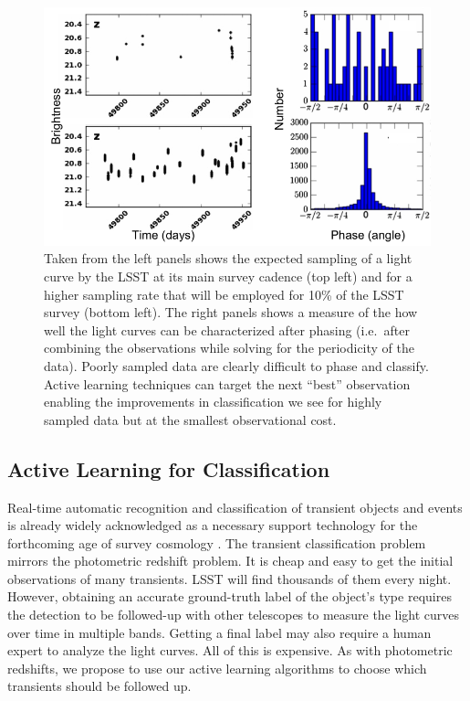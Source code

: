 \documentclass[prd,nofootbib,floatfix,11pt,tightenlines]{revtex4}
\begin{document}
\begin{figure}[t]
\centerline{
\includegraphics[scale=1.0]{rrlyrae.png}
}
\caption{
Taken from \cite{rrlyrae} the left panels shows the expected
sampling of
a light curve by the LSST at its main survey cadence (top left) and
for a higher sampling rate that will be employed for 10\% of the LSST
survey (bottom left). The right panels shows a measure of the  how well
the light curves can be characterized after phasing (i.e.\ after combining the observations while solving
for the periodicity of the data). Poorly sampled data are clearly
difficult to phase and classify. Active learning techniques can target
the next ``best'' observation enabling the improvements in
classification we see for highly sampled data but at the smallest observational cost.}

\label{fig:RRLyrae}
\end{figure}

\subsection{Active Learning for Classification}
\label{sec:transients}

Real-time automatic recognition and classification of transient objects and
events is already widely acknowledged as a necessary support technology for
the forthcoming age of survey cosmology
\cite{djorgovski2011,richards2011,richards2012,graham2012,mahabal2008a,mahabal2011a}.
The transient classification problem mirrors the photometric redshift
problem.  It is cheap and easy to get the initial observations of many
transients.  LSST will find thousands of them every night.  However,
obtaining an accurate ground-truth label of the object's type requires the
detection to be followed-up with other telescopes to measure the light
curves over time in multiple bands.  Getting a final label may also require
a human expert to analyze the light curves.  All of this is expensive.  As
with photometric redshifts, we propose to use our active learning
algorithms to choose which transients should be followed up.  
\end{document}
